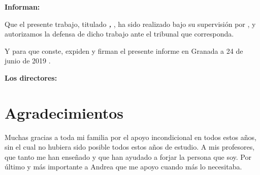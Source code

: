 \vspace{0.5cm}



\vspace{0.5cm}

\textbf{Informan:}

\vspace{0.5cm}

Que el presente trabajo, titulado \textit{\textbf{\myTitle, \mySubTitle}},
ha sido realizado bajo su supervisión por \textbf{\myName}, y autorizamos la defensa de dicho trabajo ante el tribunal
que corresponda.

\vspace{0.5cm}

Y para que conste, expiden y firman el presente informe en Granada a 24 de junio de 2019 .

\vspace{1cm}

\textbf{Los directores:}

\vspace{5cm}

\noindent \textbf{\myProf}%

\chapter*{Agradecimientos}
\thispagestyle{empty}

       \vspace{1cm}



Muchas gracias a toda mi familia por el apoyo incondicional en todos estos años,
sin el cual no hubiera sido posible todos estos años de estudio. A mis profesores,
que tanto me han enseñado y que han ayudado a forjar la persona que soy. Por último
y más importante a Andrea que me apoyo cuando más lo necesitaba.
